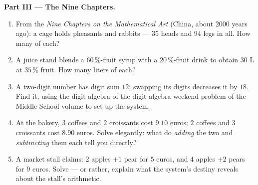 \begin{problem}
\medskip
\noindent\textbf{Part III --- The Nine Chapters.}
\begin{enumerate}[resume]
  \item From the \emph{Nine Chapters on the Mathematical Art}
        (China, about 2000 years ago): a cage holds pheasants
        and rabbits --- $35$ heads and $94$ legs in all. How
        many of each?
  \item A juice stand blends a $60\,\%$-fruit syrup with a
        $20\,\%$-fruit drink to obtain $30$ L at $35\,\%$
        fruit. How many liters of each?
  \item A two-digit number has digit sum $12$; swapping its
        digits decreases it by $18$. Find it, using the digit
        algebra of the digit-algebra weekend problem of the Middle School volume to set up the system.
  \item At the bakery, $3$ coffees and $2$ croissants cost
        $9.10$ euros; $2$ coffees and $3$ croissants cost
        $8.90$ euros. Solve elegantly: what do \emph{adding} the
        two  and \emph{subtracting} them each tell you
        directly?
  \item A market stall claims: $2$ apples $+ 1$ pear for
        $5$ euros, and $4$ apples $+ 2$ pears for $9$ euros.
        Solve --- or rather, explain what the system's destiny
        reveals about the stall's arithmetic.
\end{enumerate}


\end{problem}
